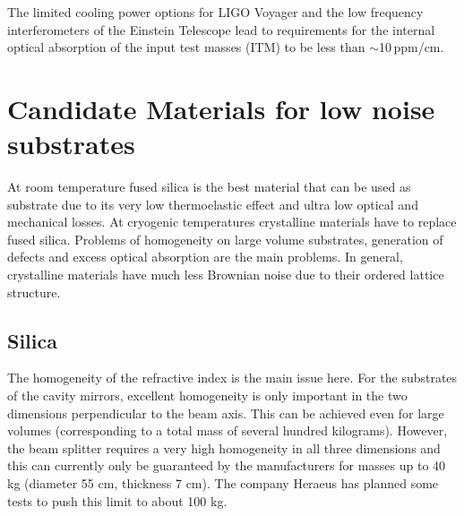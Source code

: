 
The limited cooling power options for LIGO Voyager and the low frequency interferometers of the Einstein Telescope lead to requirements for the internal optical absorption of the input test masses (ITM) to be less than $\sim$10\,ppm/cm.

\section{Candidate Materials for low noise substrates}
At room temperature fused silica is the best material that can be used as substrate due to its very low thermoelastic effect and ultra low optical and mechanical losses.
At cryogenic temperatures crystalline materials have to replace fused silica. Problems of homogeneity on large volume substrates, generation of defects and excess optical absorption are the main problems. In general, crystalline materials have much less Brownian noise due to their ordered lattice structure.
\subsection{Silica}
The homogeneity of the refractive index is the main issue here. For the substrates of the cavity mirrors, excellent homogeneity is only important in the two dimensions perpendicular to the beam axis. This can be achieved even for large volumes (corresponding to a total mass of several hundred kilograms). However, the beam splitter requires a very high homogeneity in all three dimensions and this can currently only be guaranteed by the manufacturers for masses up to 40 kg (diameter 55 cm, thickness 7 cm). The company Heraeus has planned some tests to push this limit to about 100 kg.
